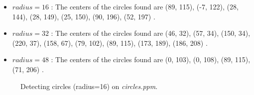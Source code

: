 \documentclass[paper=a4, fontsize=11pt]{scrartcl}
\numberwithin{equation}{section}		%
\numberwithin{figure}{section}			%
\begin{document}
\begin{itemize}
\item $ radius = 16 $ : The centers of the circles found are (89, 115), (-7, 122), (28, 144), (28, 149), (25, 150), (90, 196), (52, 197) .
\item $ radius = 32 $ : The centers of the circles found are (46, 32), (57, 34), (150, 34), (220, 37), (158, 67), (79, 102), (89, 115), (173, 189), (186, 208) .
\item $ radius = 48 $ : The centers of the circles found are  (0, 103), 
(0, 108), (89, 115), (71, 206) .
\end{itemize}

\begin{figure}[h]
\centering
{}
\caption{Detecting circles (radius=16) on \emph{circles.ppm}.}
\label{fig:hough:circle:16}
\end{figure}
\end{document}
